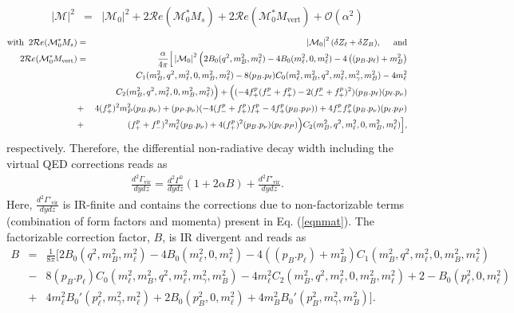 \documentclass[a4paper,11pt]{article}
\begin{document}
	    	\begin{eqnarray}
	    	\left|\mathcal{M}\right|^{2}&=& \left|\mathcal{M}_{0}\right|^{2} + 2\mathcal{R}e(\mathcal{M}_{0}^* M_{s}) + 2\mathcal{R}e (\mathcal{M}_{0}^* M_{\text{vert}}) +\mathcal{O}(\alpha^{2})
	    	\end{eqnarray}
	    {\small \begin{eqnarray}
	    	\text{with} \hspace{0.2cm}2\mathcal{R}e(\mathcal{M}_{0}^* M_{s}) &=& \left|\mathcal{M}_{0}\right|^{2}(\delta Z_{\ell} + \delta Z_{B}), \hspace{0.5cm}\text{and} \nonumber\\
	    		2\mathcal{R}e (\mathcal{M}_{0}^* M_{\text{vert}})&=&\frac{\alpha}{4\pi}\Big[\left|\mathcal{M}_{0}\right|^{2}\Big(2  B_{0}(q^{2},m_{B}^{2},m_{\ell}^{2}) - 4  B_{0}(m_{\ell}^{2},0,m_{\ell}^{2})-4\left((p_{B}.p_{\ell})+ m_{B}^{2}\right)\nonumber\\&&C_{1}(m_{B}^{2},q^{2},m_{\ell}^{2},0,m_{B}^{2},m_{\ell}^{2})- 8(p_{B}.p_{\ell})  C_{0}(m_{\ell}^{2},m_{B}^{2},q^{2},m_{\ell}^{2},m_{\gamma}^{2},m_{B}^{2})- 4 m_{\ell}^{2}\nonumber\\&& C_{2}(m_{B}^{2},q^{2},m_{\ell}^{2},0,m_{B}^{2},m_{\ell}^{2})\Big)+\Big((-4 f_{+}^{p}(f_{-}^{p}+f_{+}^{p})-2(f_{-}^{p}+f_{+}^{p})^{2})(p_{B}.p_{\ell})(p_{\ell}.p_{\nu})\nonumber\\&+&4 (f_{+}^{p})^{2}m_{P}^{2}(p_{B}.p_{\nu})+(p_{P}.p_{\nu})(-4(f_{-}^{p}+f_{+}^{p})f_{+}^{p}-4f_{+}^{p} (p_{B}.p_{P}) ) + 4f_{-}^{p}f_{+}^{p} (p_{B}.p_{\nu}) (p_{\ell}.p_{P}) \nonumber\\&+& (f_{+}^{p}+f_{-}^{p})^{2}m_{\ell}^{2} (p_{B}.p_{\nu}) + 4(f_{+}^{p})^{2}(p_{B}.p_{\nu}) (p_{\ell}.p_{P}) \Big)C_{2}(m_{B}^{2},q^{2},m_{\ell}^{2},0,m_{B}^{2},m_{\ell}^{2})\Big],
	    	\label{eqnmat}
	    	\end{eqnarray}}
respectively. Therefore, the differential non-radiative decay width including the virtual QED corrections reads as
	    	\begin{eqnarray}
	    	\frac{d^{2} \Gamma_{\text{vir}}}{dy dz}= \frac{d^{2} \Gamma^{0}}{dy dz}(1+2 \alpha B)+ \frac{d^{2} \Gamma'_{\text{vir}}}{dy dz}. 
	    	\label{dv}
	    	\end{eqnarray}
Here, $ \frac{d^{2} \Gamma'_{\text{vir}}}{dy dz}$ is IR-finite and contains the corrections due to non-factorizable terms (combination of form factors 
and momenta) present in Eq. (\ref{eqnmat}). The factorizable correction factor, $B$, is IR divergent and reads as
{\small
	    	\begin{eqnarray}
	    	B&=&\frac{1}{8\pi}\Big[2 B_{0}(q^{2},m_{B}^{2},m_{\ell}^{2})- 4  B_{0}(m_{\ell}^{2},0,m_{\ell}^{2}) -4\left((p_{B}.p_{\ell})+ m_{B}^{2}\right)C_{1}(m_{B}^{2},q^{2},m_{\ell}^{2},0,m_{B}^{2},m_{\ell}^{2})\nonumber\\&-&8(p_{B}.p_{\ell})  C_{0}(m_{\ell}^{2},m_{B}^{2},q^{2},m_{\ell}^{2},m_{\gamma}^{2},m_{B}^{2})-4 m_{\ell}^{2}C_{2}(m_{B}^{2},q^{2},m_{\ell}^{2},0,m_{B}^{2},m_{\ell}^{2})+2-B_{0}(p_{\ell}^{2},0,m_{\ell}^{2})\nonumber\\&+&4m_{\ell}^{2}B_{0}'(p_{\ell}^{2},m_{\gamma}^{2},m_{\ell}^{2})+2B_{0}(p_{B}^{2},0,m_{\ell}^{2})+4m_{B}^{2}B_{0}'(p_{B}^{2},m_{\gamma}^{2},m_{B}^{2})\Big].
	    	\end{eqnarray}}
\end{document}
